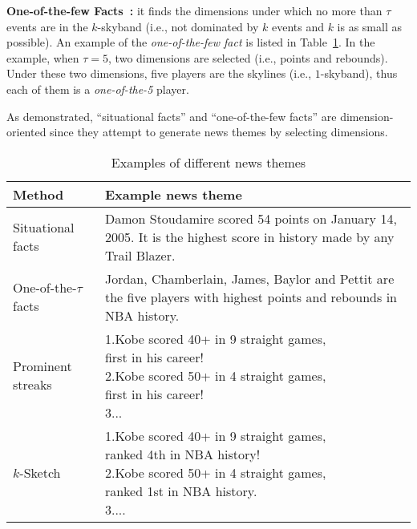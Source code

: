 \noindent\textbf{One-of-the-few Facts~\cite{wu2012one}:}  it finds the dimensions
under which no more than $\tau$ events are in the $k$-skyband (i.e., not dominated by $k$ events and $k$ is as small as possible).
An example of the \emph{one-of-the-few fact} is listed
in Table~\ref{tbl:sketh:related_works}. In the example, when $\tau=5$, two dimensions are selected (i.e., points and rebounds). Under these two dimensions, five players are the skylines (i.e., $1$-skyband), thus each of them is a \emph{one-of-the-5} player.

As demonstrated, ``situational facts''
and ``one-of-the-few facts'' are dimension-oriented since they attempt to generate news themes by selecting dimensions.


\begin{table}[h]
\centering
\caption{Examples of different news themes}
\label{tbl:sketh:related_works}
\begin{tabular}{|l|p{10cm}|}
\hline 
\textbf{Method} & \textbf{Example news theme}\\
\hline
Situational facts~\cite{sultana2014incremental} & Damon Stoudamire scored 54
points on January 14, 2005. It is the highest score in history made
by any Trail Blazer. \\
\hline
One-of-the-$\tau$ facts~\cite{wu2012one} & Jordan, Chamberlain, James, Baylor and Pettit are the five players with highest points and rebounds in NBA history. \\
\hline
Prominent streaks~\cite{zhang2014discovering} & \makecell[l]{ 1.Kobe scored 40+ in 9 straight games,\\ first in his career! \\  2.Kobe scored 50+ in 4 straight games, \\first in his career!\\  3...} \\
\hline
$k$-Sketch & \makecell[l]{1.Kobe scored 40+ in 9 straight games, \\ ranked 4th in NBA history! \\  2.Kobe scored 50+ in 4 straight games, \\ ranked 1st in NBA history.  \\ 3....} \\
\hline
\end{tabular}
\end{table}

